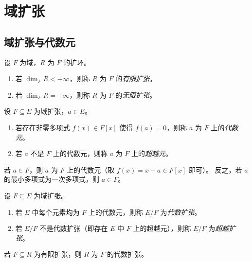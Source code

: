 \documentclass[lang=cn,a4paper,newtx]{elegantbook}
\begin{document}
\chapter{域扩张}

\section{域扩张与代数元}

\begin{definition}[有限扩张与无限扩张]
  设 $F$ 为域，$R$ 为 $F$ 的扩环。
  \begin{enumerate}
    \item 若 $\dim_F R<+\infty$，则称 $R$ 为 $F$ 的\emph{有限扩张}。
    \item 若 $\dim_F R=+\infty$，则称 $R$ 为 $F$ 的\emph{无限扩张}。
  \end{enumerate}
\end{definition}
 
\begin{definition}[代数元与超越元]
  设 $F\subseteq E$ 为域扩张，$a\in E$。
  \begin{enumerate}
    \item 若存在非零多项式 $f(x)\in F[x]$ 使得 $f(a)=0$，则称 $a$ 为 $F$ 上的\emph{代数元}。
    \item 若 $a$ 不是 $F$ 上的代数元，则称 $a$ 为 $F$ 上的\emph{超越元}。
  \end{enumerate}
\end{definition}
 
\begin{remark}
  若 $a\in F$，则 $a$ 为 $F$ 上的代数元（取 $f(x)=x-a\in F[x]$ 即可）。
  反之，若 $a$ 的最小多项式为一次多项式，则 $a\in F$。
\end{remark}
 
\begin{definition}[代数扩张与超越扩张]
  设 $F\subseteq E$ 为域扩张。
  \begin{enumerate}
    \item 若 $E$ 中每个元素均为 $F$ 上的代数元，则称 $E/F$ 为\emph{代数扩张}。
    \item 若 $E/F$ 不是代数扩张（即存在 $E$ 中 $F$ 上的超越元），则称 $E/F$ 为\emph{超越扩张}。
  \end{enumerate}
\end{definition}
 
\begin{proposition}
  若 $F\subseteq R$ 为有限扩张，则 $R$ 为 $F$ 的代数扩张。
\end{proposition}
 
\end{document}
